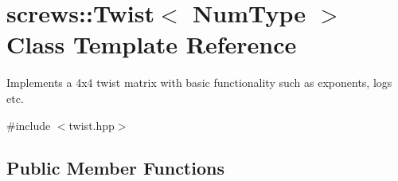 \hypertarget{singletonscrews_1_1_twist}{\section{screws\+:\+:Twist$<$ Num\+Type $>$ Class Template Reference}
\label{singletonscrews_1_1_twist}
}


Implements a 4x4 twist matrix with basic functionality such as exponents, logs etc.  




{\ttfamily \#include $<$twist.\+hpp$>$}

\subsection*{Public Member Functions}
